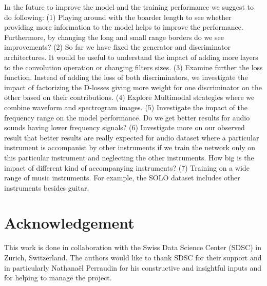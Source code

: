 \documentclass{article} %
\begin{document}
In the future to improve the model and the training performance we suggest to do following: (1) Playing around with the boarder length to see whether providing more information to the model helps to improve the performance. Furthermore, by changing the long and small range borders do we see improvements? (2) So far we have fixed the generator and discriminator architectures. It would be useful to understand the impact of adding more layers to the convolution operation or changing filters sizes. (3) Examine further the loss function. Instead of adding the loss of both discriminators, we investigate the impact of factorizing the D-losses giving more weight for one discriminator on the other based on their contributions. (4) Explore Multimodal strategies where we combine waveform and spectrogram images. (5) Investigate the impact of the frequency range on the model performance. Do we get better results for audio sounds having lower frequency signals? (6) Investigate more on our observed result that better results are really expected for audio dataset where a particular instrument is accompanist by other instruments if we train the network only on this particular instrument and neglecting the other instruments. How big is the impact of different kind of accompanying instruments? (7) Training on a wide range of music instruments. For example, the SOLO dataset includes other instruments besides guitar.

\section*{Acknowledgement}
This work is done in collaboration with the Swiss Data Science Center (SDSC) in Zurich, Switzerland. The authors would like to thank SDSC for their support and in particularly Nathanaël Perraudin for his constructive and insightful inputs and for helping to manage the project.



\end{document}
